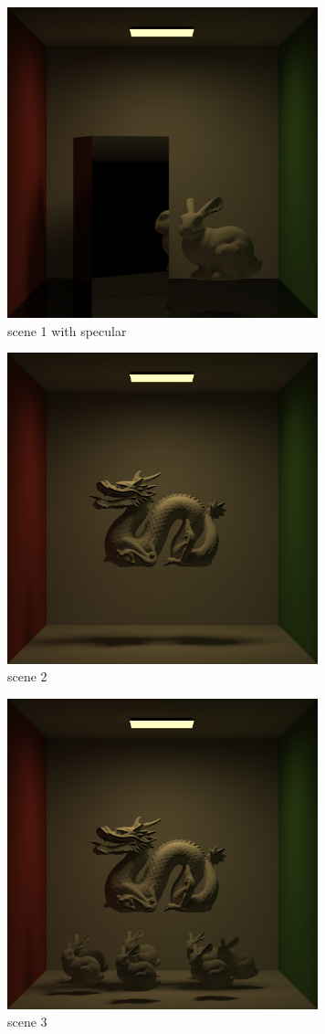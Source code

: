 \documentclass[acmtog]{acmart}
\begin{document}
	\begin{figure}[h]
		\centering
		\includegraphics[height =9cm]{output_1_4096_spec.png}
		\caption{scene 1 with specular}
	\end{figure}

	\begin{figure}[h]
		\centering
		\includegraphics[height =9cm]{output_2_4096.png}
		\caption{scene 2}
	\end{figure}

	\begin{figure}[h]
		\centering
		\includegraphics[height =9cm]{output_3_4096.png}
		\caption{scene 3}
	\end{figure}
\end{document}

